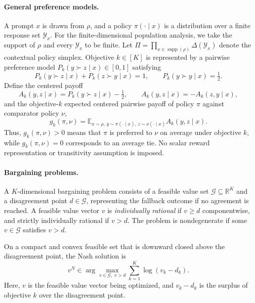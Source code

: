 \documentclass{article}
\theoremstyle{remark}
\theoremstyle{plain}
\newcommand{\Y}{\mathcal{Y}}
\newcommand{\G}{\mathcal{G}}
\newcommand{\E}{\mathbb{E}}
\newcommand{\R}{\mathbb{R}}
\begin{document}
\paragraph{General preference models.}
A prompt $x$ is drawn from $\rho$, and a policy $\pi(\cdot\mid x)$ is a distribution over a finite response set $\Y_x$. For the finite-dimensional population analysis, we take the support of $\rho$ and every $\Y_x$ to be finite. Let $\Pi=\prod_{x\in\operatorname{supp}(\rho)}\Delta(\Y_x)$ denote the contextual policy simplex. Objective $k\in[K]$ is represented by a pairwise preference model $P_k(y\succ z\mid x)\in[0,1]$ satisfying
\begin{equation}
P_k(y\succ z\mid x)+P_k(z\succ y\mid x)=1,
\qquad P_k(y\succ y\mid x)=\tfrac12.
\label{eq:skew}
\end{equation}
Define the centered payoff
\begin{equation}
A_k(y,z\mid x)=P_k(y\succ z\mid x)-\tfrac12,
\qquad
A_k(y,z\mid x)=-A_k(z,y\mid x),
\label{eq:centered}
\end{equation}
and the objective-$k$ expected centered pairwise payoff of policy $\pi$ against comparator policy $\nu$,
\begin{equation}
g_k(\pi,\nu)
=\E_{x\sim\rho,\,y\sim\pi(\cdot\mid x),\,z\sim\nu(\cdot\mid x)}A_k(y,z\mid x).
\label{eq:game-payoff}
\end{equation}
Thus, $g_k(\pi,\nu)>0$ means that $\pi$ is preferred to $\nu$ on average under objective $k$, while $g_k(\pi,\nu)=0$ corresponds to an average tie. No scalar reward representation or transitivity assumption is imposed.

\paragraph{Bargaining problems.}
A $K$-dimensional bargaining problem consists of a feasible value set
$\G\subseteq\R^K$ and a disagreement point $d\in\G$, representing the
fallback outcome if no agreement is reached. A feasible value vector
$v$ is \emph{individually rational} if $v\ge d$ componentwise, and
strictly individually rational if $v>d$. The problem is nondegenerate
if some $v\in\G$ satisfies $v>d$.

On a compact and convex feasible set that is downward closed above the
disagreement point, the Nash solution is
\begin{equation}
v^N
\in
\arg\max_{v\in\G,\;v>d}
\sum_{k=1}^K\log(v_k-d_k).
\end{equation}
Here, $v$ is the feasible value vector being optimized, and
$v_k-d_k$ is the surplus of objective $k$ over the disagreement point.
\end{document}
